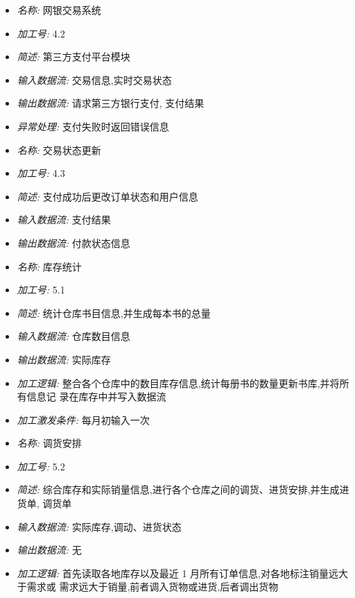 \documentclass{article}
\begin{document}
\begin{CJK*}{UTF8}{gbsn}
\begin{itemize}
\end{itemize}


\vspace{-1mm}


\begin{itemize}
\item \textit{名称: } 网银交易系统
\item \textit{加工号: } 4.2
\item \textit{简述: } 第三方支付平台模块
\item \textit{输入数据流: } 交易信息,实时交易状态 
\item \textit{输出数据流: } 请求第三方银行支付, 支付结果 
\item \textit{异常处理: } 支付失败时返回错误信息

\end{itemize}


\vspace{-1mm}


\begin{itemize}
\item \textit{名称: } 交易状态更新
\item \textit{加工号: } 4.3
\item \textit{简述: } 支付成功后更改订单状态和用户信息 
\item \textit{输入数据流: } 支付结果
\item \textit{输出数据流: } 付款状态信息

\end{itemize}


\vspace{-1mm}


\begin{itemize}
\item \textit{名称: } 库存统计
\item \textit{加工号: }5.1 
\item \textit{简述: }统计仓库书目信息,并生成每本书的总量
\item \textit{输入数据流: } 仓库数目信息
\item \textit{输出数据流: } 实际库存 
\item \textit{加工逻辑: }整合各个仓库中的数目库存信息,统计每册书的数量更新书库,并将所有信息记 录在库存中并写入数据流
\item \textit{加工激发条件: } 每月初输入一次

\end{itemize}


\vspace{-1mm}


\begin{itemize}
\item \textit{名称: }调货安排
\item \textit{加工号: }5.2
\item \textit{简述: } 综合库存和实际销量信息,进行各个仓库之间的调货、进货安排,并生成进货单, 调货单
\item \textit{输入数据流: } 实际库存,调动、进货状态
\item \textit{输出数据流: } 无
\item \textit{加工逻辑: } 首先读取各地库存以及最近 1 月所有订单信息,对各地标注销量远大于需求或 需求远大于销量,前者调入货物或进货,后者调出货物


\end{itemize}
\end{CJK*}
\end{document}
